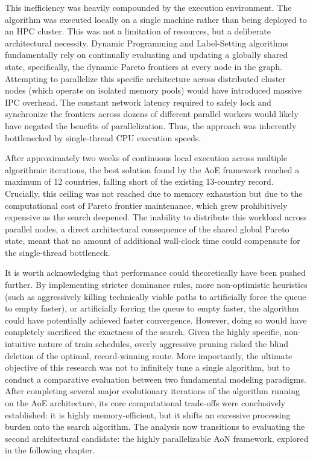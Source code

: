 \medskip

This inefficiency was heavily compounded by the execution environment. The algorithm was executed locally on a single machine rather than being deployed to an HPC cluster. This was not a limitation of resources, but a deliberate architectural necessity. Dynamic Programming and Label-Setting algorithms fundamentally rely on continually evaluating and updating a globally shared state, specifically, the dynamic Pareto frontiers at every node in the graph. Attempting to parallelize this specific architecture across distributed cluster nodes (which operate on isolated memory pools) would have introduced massive IPC overhead. The constant network latency required to safely lock and synchronize the frontiers across dozens of different parallel workers would likely have negated the benefits of parallelization. Thus, the approach was inherently bottlenecked by single-thread CPU execution speeds.

\medskip

After approximately two weeks of continuous local execution across multiple algorithmic iterations, the best solution found by the AoE framework reached a maximum of 12 countries, falling short of the existing 13-country record. Crucially, this ceiling was not reached due to memory exhaustion but due to the computational cost of Pareto frontier maintenance, which grew prohibitively expensive as the search deepened. The inability to distribute this workload across parallel nodes, a direct architectural consequence of the shared global Pareto state, meant that no amount of additional wall-clock time could compensate for the single-thread bottleneck. 

\medskip

It is worth acknowledging that performance could theoretically have been pushed further. By implementing stricter dominance rules, more non-optimistic heuristics (such as aggressively killing technically viable paths to artificially force the queue to empty faster), or artificially forcing the queue to empty faster, the algorithm could have potentially achieved faster convergence. However, doing so would have completely sacrificed the exactness of the search. Given the highly specific, non-intuitive nature of train schedules, overly aggressive pruning risked the blind deletion of the optimal, record-winning route. More importantly, the ultimate objective of this research was not to infinitely tune a single algorithm, but to conduct a comparative evaluation between two fundamental modeling paradigms. After completing several major evolutionary iterations of the algorithm running on the AoE architecture, its core computational trade-offs were conclusively established: it is highly memory-efficient, but it shifts an excessive processing burden onto the search algorithm. The analysis now transitions to evaluating the second architectural candidate: the highly parallelizable AoN framework, explored in the following chapter.
